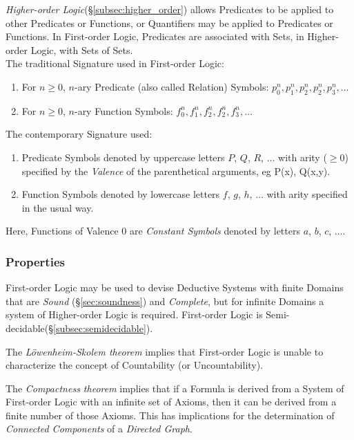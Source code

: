 \documentclass{article}
\begin{document}
\emph{Higher-order Logic}(\S\ref{subsec:higher_order}) allows Predicates
to be applied to other Predicates or Functions, or Quantifiers may be
applied to Predicates or Functions. In First-order Logic, Predicates
are associated with Sets, in Higher-order Logic, with Sets of
Sets.
\\
The traditional Signature used in First-order Logic:
\begin{enumerate}
\item For $n \geq 0$, $n$-ary Predicate (also called Relation)
  Symbols: $p^{n}_0, p^{n}_1, p^{n}_2, p^{n}_2, p^{n}_3, \ldots$
\item For $n \geq 0$, $n$-ary Function Symbols: $f^{n}_0, f^{n}_1,
  f^{n}_2, f^{n}_2, f^{n}_3, \ldots$
\end{enumerate}
The contemporary Signature used:
\begin{enumerate}
\item Predicate Symbols denoted by uppercase letters $P$, $Q$, $R$,
  $\ldots$ with arity ($\geq 0$) specified by the \emph{Valence} of the
  parenthetical arguments, eg P(x), Q(x,y).
\item Function Symbols denoted by lowercase letters $f$, $g$, $h$,
  $\ldots$ with arity specified in the usual way.
\end{enumerate}
Here, Functions of Valence 0 are \emph{Constant Symbols} denoted by
letters $a$, $b$, $c$, $\ldots$.

\subsubsection{Properties}\label{subsec:first_order_properties}

First-order Logic may be used to devise Deductive Systems with finite
Domains that are \emph{Sound} (\S\ref{sec:soundness}) and
\emph{Complete}, but for infinite Domains a system of Higher-order
Logic is required. First-order Logic is
Semi-decidable(\S\ref{subsec:semidecidable}).

The \emph{L\"owenheim-Skolem theorem} implies that First-order Logic
is unable to characterize the concept of Countability (or
Uncountability).

The \emph{Compactness theorem} implies that if a Formula is derived
from a System of First-order Logic with an infinite set of Axioms,
then it can be derived from a finite number of those Axioms. This has
implications for the determination of \emph{Connected Components} of a
\emph{Directed Graph}. %
\end{document}
